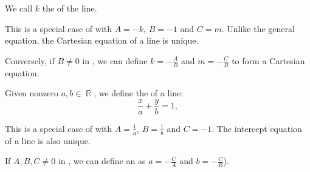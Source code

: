 \begin{definition}
\begin{thmenum}
    We call \( k \) the  of the line.

    This is a special case of  with \( A = -k \), \( B = -1 \) and \( C = m \). Unlike the general equation, the Cartesian equation of a line is unique.

    Conversely, if \( B \neq 0 \) in , we can define \( k = -\tfrac A B \) and \( m = -\tfrac C B \) to form a Cartesian equation.

     Given nonzero \( a, b \in \BbbR \), we define the  of a line:
    \begin{equation}\label{def:plane_line_equations/intercept_equation}
      \frac x a + \frac y b = 1,
    \end{equation}

    This is a special case of  with \( A = \frac 1 a \), \( B = \frac 1 b \) and \( C = -1 \). The intercept equation of a line is also unique.

    If \( A, B, C \neq 0 \) in , we can define an  as \( a = -\tfrac C A \) and \( b = -\tfrac C B \)).
  \end{thmenum}
\end{definition}

